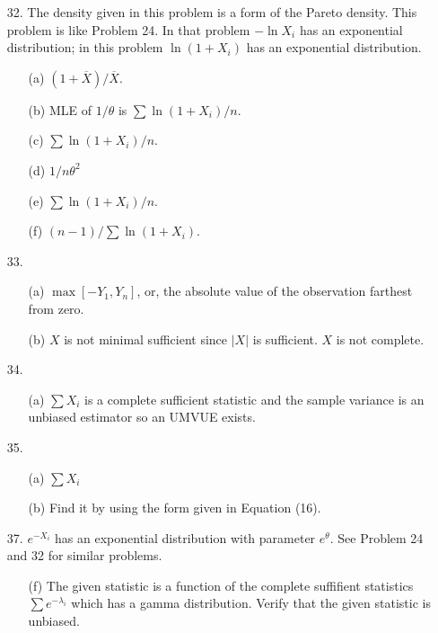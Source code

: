 \begin{enumerate}
	\item[32.] The density given in this problem is a form of the Pareto density.  This problem is like Problem 24.  In that problem $-\ln X_i$ has an exponential distribution; in this problem $\ln(1+X_i)$ has an exponential distribution.
	\begin{enumerate}
		\item[(a)] $(1+\overline{X})/\overline{X}$.
		\item[(b)] MLE of $1/\theta$ is $\sum \ln(1+X_i)/n$.
		\item[(c)] $\sum \ln(1+X_i)/n$.
		\item[(d)] $1/n\theta^2$
		\item[(e)] $\sum \ln(1+X_i)/n$.
		\item[(f)] $(n-1)/\sum \ln(1+X_i)$.
	\end{enumerate}
	
	\item[33.] \begin{enumerate}
		\item[(a)] $\max[-Y_1,Y_n]$, or, the absolute value of the observation farthest from zero.
		\item[(b)] $X$ is not minimal sufficient since $\vert X\vert$ is sufficient. $X$ is not complete.
	\end{enumerate}  
	
	\item[34.] \begin{enumerate}
		\item[(a)] $\sum X_i$ is a complete sufficient statistic and the sample variance is an unbiased estimator so an UMVUE exists.
		\end{enumerate}	  
	
	\item[35.] \begin{enumerate}
		\item[(a)] $\sum X_i$
		\item[(b)] Find it by using the form given in Equation (16).
	\end{enumerate}
	
	\item[37.] $e^{-X_i}$ has an exponential distribution with parameter $e^\theta$.  See Problem 24 and 32 for similar problems.  
	\begin{enumerate}
		\item[(f)] The given statistic is a function of the complete suffifient statistics $\sum e^{-\lambda_i}$ which has a gamma distribution.  Verify that the given statistic is unbiased. 
	\end{enumerate}
	 

\end{enumerate}
